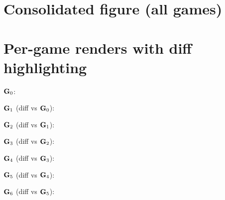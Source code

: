 \documentclass[11pt]{article}
\begin{document}
\pagestyle{empty}
\section*{Consolidated figure (all games)}
\newpage
\section*{Per-game renders with diff highlighting}
\noindent$\textbf{G}_0$:\par{}
\noindent$\textbf{G}_1$ (diff vs $\textbf{G}_0$):\par{}
\newpage
\noindent$\textbf{G}_2$ (diff vs $\textbf{G}_1$):\par{}
\noindent$\textbf{G}_3$ (diff vs $\textbf{G}_2$):\par{}
\newpage
\noindent$\textbf{G}_4$ (diff vs $\textbf{G}_3$):\par{}
\noindent$\textbf{G}_5$ (diff vs $\textbf{G}_4$):\par{}
\newpage
\noindent$\textbf{G}_6$ (diff vs $\textbf{G}_5$):\par{}
\end{document}
